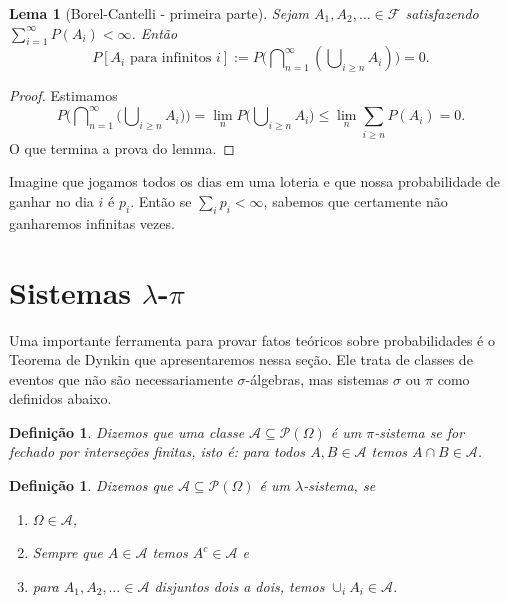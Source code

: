 \documentclass[reqno, final]{book}
\newcommand*\1{\mathds{1}}
\newtheorem{lemma}[theorem]{Lema}
\newtheorem{definition}[theorem]{Definição}
\DeclareMathOperator*{\mcup}{{\textstyle \bigcup}}
\DeclareMathOperator*{\mcap}{{\textstyle \bigcap}}
\begin{document}
\begin{lemma}[Borel-Cantelli - primeira parte]
  Sejam $A_1, A_2, \dots \in \mathcal{F}$ satisfazendo $\sum_{i = 1}^\infty P(A_i) < \infty$.
  Então
  \begin{equation}
    P[\text{$A_i$ para infinitos $i$}] := P\big({\mcap\nolimits_{n = 1}^\infty} ({\mcup\nolimits_{i \geq n}} A_i)\big) = 0.
  \end{equation}
\end{lemma}

\begin{proof}
  Estimamos
  \begin{equation}
    P \Big( {\mcap_{n = 1}^\infty} \big({\mcup\nolimits_{i \geq n}} A_i \big) \Big) = \lim_n P \big( {\mcup\nolimits_{i \geq n}} A_i \big) \leq \lim_n {\textstyle\sum\limits_{i \geq n}} P(A_i) = 0.
  \end{equation}
  O que termina a prova do lemma.
\end{proof}

Imagine que jogamos todos os dias em uma loteria e que nossa probabilidade de ganhar no dia $i$ é $p_i$.
Então se $\sum_i p_i < \infty$, sabemos que certamente não ganharemos infinitas vezes.

\section{Sistemas \texorpdfstring{$\lambda$-$\pi$}{lambda-pi}}

Uma importante ferramenta para provar fatos teóricos sobre probabilidades é o Teorema de Dynkin que apresentaremos nessa seção.
Ele trata de classes de eventos que não são necessariamente $\sigma$-álgebras, mas sistemas $\sigma$ ou $\pi$ como definidos abaixo.

\begin{definition}
  Dizemos que uma classe $\mathcal{A} \subseteq \mathcal{P}(\Omega)$ é um $\pi$-sistema  se for fechado por interseções finitas, isto é: para todos $A, B \in \mathcal{A}$ temos $A \cap B \in \mathcal{A}$.
\end{definition}

\begin{definition}
  Dizemos que $\mathcal{A} \subseteq \mathcal{P}(\Omega)$ é um $\lambda$-sistema,  se
  \begin{enumerate}[\quad a)]
  \item $\Omega \in \mathcal{A}$,
  \item Sempre que $A \in \mathcal{A}$ temos $A^c \in \mathcal{A}$ e
  \item para $A_1, A_2, \dots \in \mathcal{A}$ disjuntos dois a dois, temos $\cup_i A_i \in \mathcal{A}$.
  \end{enumerate}
\end{definition}
\end{document}
